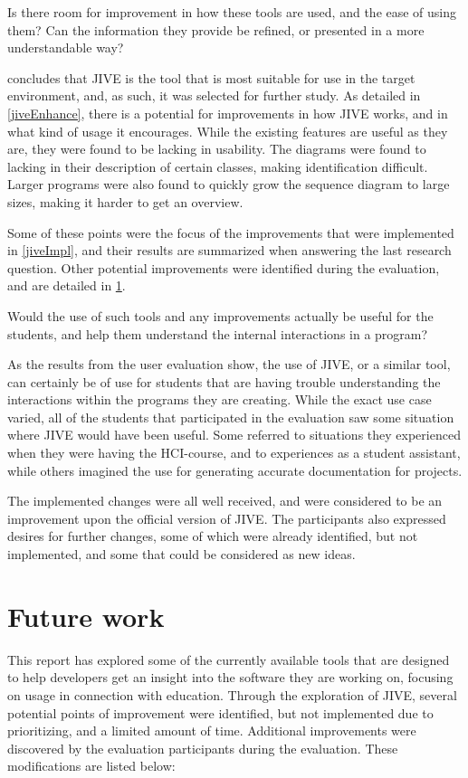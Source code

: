 \begin{theorem}
Is there room for improvement in how these tools are used, and the ease of using them? Can the information they provide be refined, or presented in a more understandable way?
\end{theorem}

 concludes that JIVE is the tool that is most suitable for use in the target environment, and, as such, it was selected for further study.
As detailed in \cref{jiveEnhance}, there is a potential for improvements in how JIVE works, and in what kind of usage it encourages.
While the existing features are useful as they are, they were found to be lacking in usability.
The diagrams were found to lacking in their description of certain classes, making identification difficult.
Larger programs were also found to quickly grow the sequence diagram to large sizes, making it harder to get an overview.


Some of these points were the focus of the improvements that were implemented in \cref{jiveImpl}, and their results are summarized when answering the last research question.
Other potential improvements were identified during the evaluation, and are detailed in \cref{conclusionFuture}.


\begin{theorem}
Would the use of such tools and any improvements actually be useful for the students, and help them understand the internal interactions in a program?
\end{theorem}

As the results from the user evaluation show, the use of JIVE, or a similar tool, can certainly be of use for students that are having trouble understanding the interactions within the programs they are creating.
While the exact use case varied, all of the students that participated in the evaluation saw some situation where JIVE would have been useful.
Some referred to situations they experienced when they were having the HCI-course, and to experiences as a student assistant, while others imagined the use for generating accurate documentation for projects.


The implemented changes were all well received, and were considered to be an improvement upon the official version of JIVE.
The participants also expressed desires for further changes, some of which were already identified, but not implemented, and some that could be considered as new ideas.


\section{Future work}\label{conclusionFuture}
This report has explored some of the currently available tools that are designed to help developers get an insight into the software they are working on, focusing on usage in connection with education.
Through the exploration of JIVE, several potential points of improvement were identified, but not implemented due to prioritizing, and a limited amount of time.
Additional improvements were discovered by the evaluation participants during the evaluation.
These modifications are listed below: %


